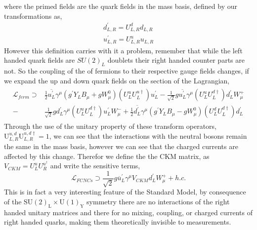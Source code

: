 {where the primed fields are the quark fields in the mass basis, defined by our transformations as, 
\begin{equation}
\begin{split}
d^\prime_{L,R} = U^d_{L,R} d_{L,R} \\
u^\prime_{L,R} = U^u_{L,R} u_{L,R} 
\end{split}  
\end{equation}
%
However this definition carries with it a problem, remember that while the left handed quark fields are $SU(2)_L$ doublets their right handed counter parts are not. So the coupling of the of fermions to their respective gauge fields changes, if we expand the up and down quark fields on the section of the Lagrangian,
\begin{align}
\begin{split}
\mathcal{L}_{ferm} \supset & 
\frac{1}{2} \overline{u^\prime_L} \gamma^\mu \left( g^\prime Y_L B_\mu + g W^0_\mu  \right) \left(U^u_L U^{u \dagger}_L \right) u^\prime_L - \frac{1}{\sqrt{2}} g \overline{u^\prime_L} \gamma^\mu \left( U^u_L U^{d \dagger}_L \right) d^\prime_L W^+_\mu \\ \nonumber   
- 
& \frac{1}{\sqrt{2}} g d^\prime_L \gamma^\mu \left( U^u_L U^{d \dagger}_L \right) u^\prime_L W^-_\mu 
+ 
\frac{1}{2} \overline{d^\prime_L} \gamma^\mu \left( g^\prime Y_L B_\mu - g W^0_\mu \right) \left( U^d_L U^{d \dagger}_L \right) d^\prime_L  
\end{split}
\end{align}
Through the use of the unitary property of these transform operators, $ \mathrm{U}^{u,d}_{L,R} \mathrm{U}^{u,d \dagger}_{L,R} = 1$, we can see that the interactions with the neutral bosons remain the same in the mass basis, however we can see that the charged currents are affected by this change. Therefor we define the the CKM matrix, as $V_{CKM} = U^u_L U^{u ^\dagger }_R $ and write the sensitive terms,
\begin{equation}
\mathcal{L}_{FCNCs} \supset \frac{1}{\sqrt{2}} g \overline{u}^\prime_L \gamma^\mu V_{CKM} d_L^\prime W^+_\mu + h.c. 
\end{equation}
This is in fact a very interesting feature of the Standard Model, by consequence of the $\mathrm{SU(2)_L \times U(1)_Y }$ symmetry there are no interactions of the right handed unitary matrices and there for no mixing, coupling, or charged currents of right handed quarks, making them theoretically invisible to measurements.  

%

}
